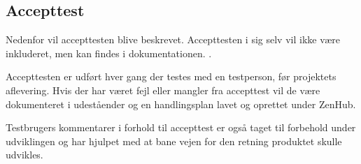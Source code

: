 \subsection{Accepttest}

Nedenfor vil accepttesten blive beskrevet. Accepttesten i sig selv vil ikke være inkluderet, men kan findes i dokumentationen. \cite{Accepttest}. 

Accepttesten er udført hver gang der testes med en testperson, før projektets aflevering. Hvis der har været fejl eller mangler fra accepttest vil de være dokumenteret i udeståender og en handlingsplan lavet og oprettet under ZenHub.

Testbrugers kommentarer i forhold til accepttest er også taget til forbehold under udviklingen og har hjulpet med at bane vejen for den retning produktet skulle udvikles.
